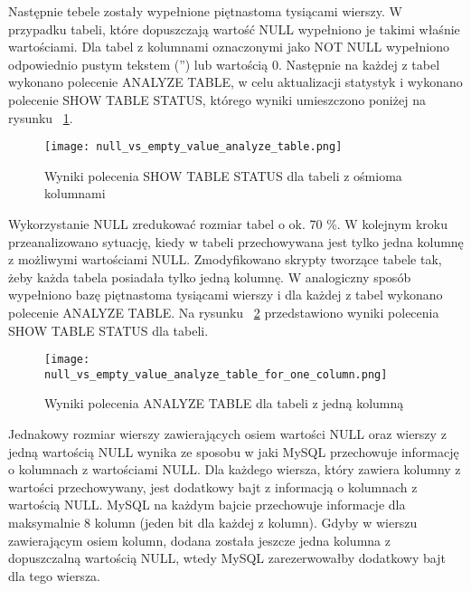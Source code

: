 Następnie tebele zostały wypełnione piętnastoma tysiącami wierszy. W przypadku tabeli, które dopuszczają wartość NULL wypełniono je takimi właśnie wartościami. Dla tabel z kolumnami oznaczonymi jako NOT NULL wypełniono odpowiednio pustym tekstem ('') lub wartością 0.
Następnie na każdej z tabel wykonano polecenie ANALYZE TABLE, w celu aktualizacji statystyk i wykonano polecenie SHOW TABLE STATUS, którego wyniki umieszczono poniżej na rysunku ~\ref{fig:null_vs_empty_value_analyze_table}.

\begin{figure}
	\caption{Wyniki polecenia SHOW TABLE STATUS dla tabeli z ośmioma kolumnami}
	\centering
	\texttt{[image: null\_vs\_empty\_value\_analyze\_table.png]}
	\label{fig:null_vs_empty_value_analyze_table}
\end{figure}

Wykorzystanie NULL zredukować rozmiar tabel o ok. 70 \%. W kolejnym kroku przeanalizowano sytuację, kiedy w tabeli przechowywana jest tylko jedna kolumnę z możliwymi wartościami NULL. Zmodyfikowano skrypty tworzące tabele tak, żeby każda tabela posiadała tylko jedną kolumnę. W analogiczny sposób wypełniono bazę piętnastoma tysiącami wierszy i dla każdej z tabel wykonano polecenie ANALYZE TABLE. Na rysunku ~\ref{fig:null_vs_empty_value_analyze_table_for_one_column} przedstawiono wyniki polecenia SHOW TABLE STATUS dla tabeli.

\begin{figure}
	\caption{Wyniki polecenia ANALYZE TABLE dla tabeli z jedną kolumną}
	\centering
	\texttt{[image: null\_vs\_empty\_value\_analyze\_table\_for\_one\_column.png]}
	\label{fig:null_vs_empty_value_analyze_table_for_one_column}
\end{figure}

Jednakowy rozmiar wierszy zawierających osiem wartości NULL oraz wierszy z jedną wartością NULL wynika ze sposobu w jaki MySQL przechowuje informację o kolumnach z wartościami NULL. Dla każdego wiersza, który zawiera kolumny z wartości przechowywany, jest dodatkowy bajt z informacją o kolumnach z wartością NULL. MySQL na każdym bajcie przechowuje informacje dla maksymalnie 8 kolumn (jeden bit dla każdej z kolumn). Gdyby w wierszu zawierającym osiem kolumn, dodana została jeszcze jedna kolumna z dopuszczalną wartością NULL, wtedy MySQL zarezerwowałby dodatkowy bajt dla tego wiersza.


